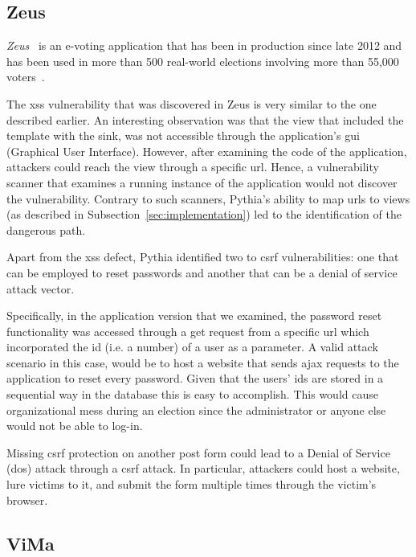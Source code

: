 \subsection{Zeus}
\label{sec:zeus}

{\it Zeus}~\cite{zeus-jets, zeus}
is an e-voting application
that has been in production
since late 2012 and
has been used in more than 500
real-world elections involving
more than 55,000 voters~\cite{pnrmx-del}.

The {\sc xss} vulnerability
that was discovered in Zeus is very
similar to the one described earlier.
An interesting observation
was that the view that included
the template with the sink,
was not accessible through the
application's
{\sc gui} (Graphical User Interface).
However,
after examining the code of the application,
attackers could reach the view through
a specific {\sc url}.
Hence,
a vulnerability scanner that examines
a running instance of the application
would not discover the vulnerability.
Contrary to such scanners,
Pythia's
ability to map {\sc url}s to views
(as described in
Subsection~\ref{sec:implementation})
led to the identification of the
dangerous path.

Apart from the {\sc xss} defect,
Pythia identified two
to {\sc csrf} vulnerabilities:
one that can be employed to reset
passwords and another that
can be a denial of service attack vector.

Specifically,
in the application version that we examined,
the password reset functionality was
accessed through a {\sc get} request from
a specific {\sc url} which incorporated
the {\sc id} (i.e. a number) of a user
as a parameter.
A valid attack scenario in this case,
would be to host a website that sends
{\sc ajax} requests to the application
to reset every password.
Given that the users' {\sc id}s
are stored in a sequential way
in the database this is easy to accomplish.
This would cause organizational mess
during an election since the administrator
or anyone else would not be able to log-in.

Missing {\sc csrf} protection on
another {\sc post} form could lead to
a Denial of Service ({\sc d}o{\sc s})
attack through a {\sc csrf} attack.
In particular,
attackers could host a website,
lure victims to it,
and submit the form multiple times
through the victim's browser.

\subsection{ViMa}
\label{sec:vima}

